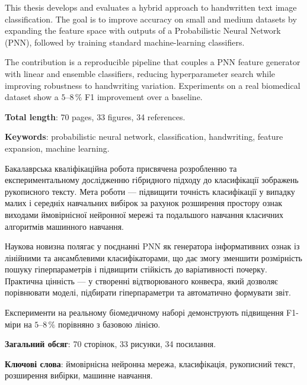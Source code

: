 \documentclass{article}
\begin{document}
\begin{enabstract}
  This thesis develops and evaluates a hybrid approach to handwritten text image classification.
  The goal is to improve accuracy on small and medium datasets by expanding the feature space with
  outputs of a Probabilistic Neural Network (PNN), followed by training standard machine-learning
  classifiers.

  The contribution is a reproducible pipeline that couples a PNN feature generator with linear
  and ensemble classifiers, reducing hyperparameter search while improving robustness to handwriting
  variation. Experiments on a real biomedical dataset show a $5$--$8\,\%$ F1 improvement over a
  baseline.

  \textbf{Total length}: 70 pages, 33 figures, 34 references.

  \textbf{Keywords}: probabilistic neural network, classification, handwriting, feature expansion, machine learning.
\end{enabstract}

\begin{uaabstract}
  Бакалаврська кваліфікаційна робота присвячена розробленню та експериментальному
  дослідженню гібридного підходу до класифікації зображень рукописного тексту. Мета роботи —
  підвищити точність класифікації у випадку малих і середніх навчальних вибірок за рахунок
  розширення простору ознак виходами ймовірнісної нейронної мережі та подальшого навчання
  класичних алгоритмів машинного навчання.

  Наукова новизна полягає у поєднанні PNN як генератора інформативних ознак із
  лінійними та ансамблевими класифікаторами, що дає змогу зменшити розмірність пошуку
  гіперпараметрів і підвищити стійкість до варіативності почерку. Практична цінність — у створенні
  відтворюваного конвеєра, який дозволяє порівнювати моделі, підбирати гіперпараметри та
  автоматично формувати звіт.

  Експерименти на реальному біомедичному наборі демонструють підвищення F1-міри на
  $5$–$8\,\%$ порівняно з базовою лінією.

  \textbf{Загальний обсяг}: 70 сторінок, 33 рисунки, 34 посилання.

  \textbf{Ключові слова}: ймовірнісна нейронна мережа, класифікація, рукописний текст, розширення
  вибірки, машинне навчання.
\end{uaabstract}
\end{document}
